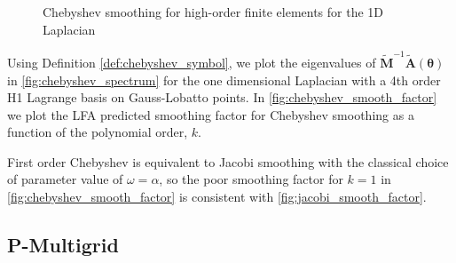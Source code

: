 \documentclass[review]{siamart190516}
\begin{document}
\begin{figure}[!tbp]
  \centering
  \hfill
  \caption{Chebyshev smoothing for high-order finite elements for the 1D Laplacian}
\end{figure}

Using Definition \ref{def:chebyshev_symbol}, we plot the eigenvalues of $\tilde{\mathbf{M}}^{-1} \tilde{\mathbf{A}} \left( \boldsymbol{\theta} \right)$ in \cref{fig:chebyshev_spectrum} for the one dimensional Laplacian with a 4th order H1 Lagrange basis on Gauss-Lobatto points.
In \cref{fig:chebyshev_smooth_factor} we plot the LFA predicted smoothing factor for Chebyshev smoothing as a function of the polynomial order, $k$.

First order Chebyshev is equivalent to Jacobi smoothing with the classical choice of parameter value of $\omega = \alpha$, so the poor smoothing factor for $k = 1$ in \cref{fig:chebyshev_smooth_factor} is consistent with \cref{fig:jacobi_smooth_factor}.

\subsection{P-Multigrid}\label{sec:multigrid}
\end{document}
